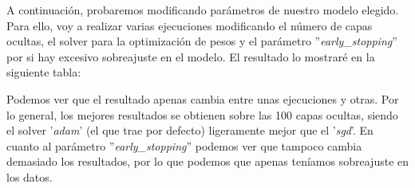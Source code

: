 \documentclass[11pt,a4paper]{article}
\begin{document}
A continuación, probaremos modificando parámetros de nuestro modelo elegido. Para ello, voy a realizar varias ejecuciones
modificando el número de capas ocultas, el solver para la optimización de pesos y el parámetro ''\textit{early\_stopping}''
por si hay excesivo sobreajuste en el modelo. El resultado lo mostraré en la siguiente tabla:
\begin{table}[H]
    \centering
\end{table}
\begin{table}[H]
    \centering
\end{table}

Podemos ver que el resultado apenas cambia entre unas ejecuciones y otras. Por lo general, los mejores resultados se obtienen
sobre las 100 capas ocultas, siendo el solver '\textit{adam}' (el que trae por defecto) ligeramente mejor que el '\textit{sgd}'.
En cuanto al parámetro ''\textit{early\_stopping}'' podemos ver que tampoco cambia demasiado los resultados, por lo que podemos
que apenas teníamos sobreajuste en los datos.
\end{document}

